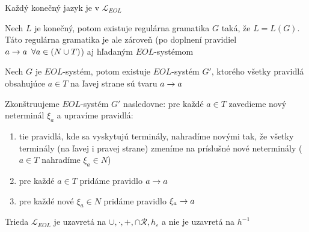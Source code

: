 \begin{veta}
Každý konečný jazyk je v $\mathcal{L}_{EOL}$
\end{veta}

\begin{dokaz}
Nech $L$ je konečný, potom existuje regulárna gramatika $G$ taká,
že $L=L(G)$. Táto regulárna gramatika je ale zároveň (po doplnení
pravidiel $a\rightarrow a\enspace\forall a\in(N\cup T)$) aj hľa\-da\-ným
$EOL$-systémom
\end{dokaz}

\begin{lema}
\label{norm_tvarEOL} Nech $G$ je $EOL$-systém, potom existuje
$EOL$-systém $G'$, ktorého všetky pravidlá obsahujúce $a\in T$ na
ľavej strane sú tvaru $a\rightarrow a$
\end{lema}

\begin{dokaz}
Zkonštruujeme $EOL$-systém $G'$ nasledovne: pre každé $a\in T$
zavedieme nový neterminál $\xi_{a}$ a upravíme pravidlá:
\begin{enumerate}
\item tie pravidlá, kde sa vyskytujú terminály, nahradíme novými tak,
že všetky terminály (na ľavej i pravej strane) zmeníme na
príslušné nové neterminály ($a\in T$ nahradíme $\xi_{a}\in N$)
\item pre každé $a\in T$ pridáme pravidlo $a\rightarrow a$
\item pre každé nové $\xi_{a}\in N$ pridáme pravidlo $\xi_{a}\rightarrow a$
\end{enumerate}
\end{dokaz}

\begin{veta}
Trieda $\mathcal{L}_{EOL}$ je uzavretá na
$\cup,\cdot,+,\cap\mathcal{R},h_{\varepsilon}$ a nie je uzavretá
na $h^{-1}$
\end{veta}

